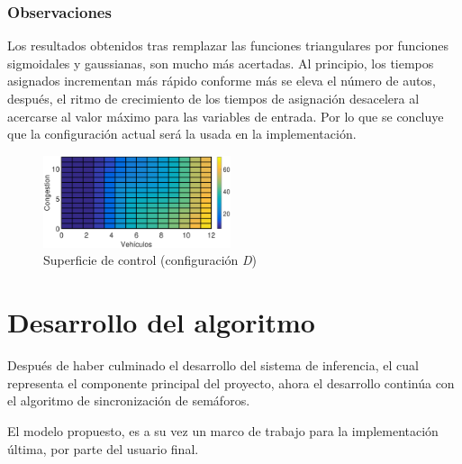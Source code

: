 \subsubsection{Observaciones}

\begin{multicols}{2}
	Los resultados obtenidos tras remplazar las funciones triangulares por funciones sigmoidales y gaussianas, son mucho más acertadas. Al principio, los tiempos asignados incrementan más rápido conforme más se eleva el número de autos, después, el ritmo de crecimiento de los tiempos de asignación desacelera al acercarse al valor máximo para las variables de entrada. Por lo que se concluye que la configuración actual será la usada en la implementación.
	
	\begin{figure}[H]
	\includegraphics[width=0.49\textwidth]{Surfaces/Surface2D_D.eps}
	\caption{Superficie de control (configuración \textit{D})}
\end{figure}
\end{multicols}
\pagebreak

\section{Desarrollo del algoritmo}\label{section:desarrolloAlgoritmo}
Después de haber culminado el desarrollo del sistema de inferencia, el cual representa el componente principal del proyecto, ahora el desarrollo continúa con el algoritmo de sincronización de semáforos.

El modelo propuesto, es a su vez un marco de trabajo para la implementación última, por parte del usuario final.

